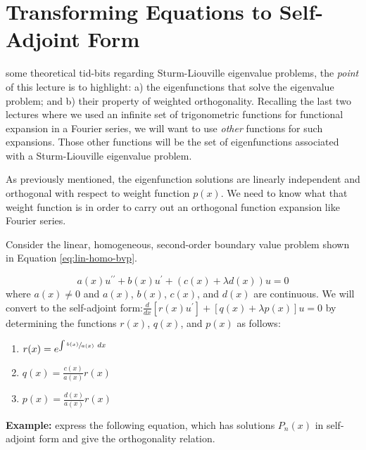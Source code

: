 \section{Transforming Equations to Self-Adjoint Form}
 some theoretical tid-bits regarding Sturm-Liouville eigenvalue problems, the \emph{point} of this lecture is to highlight: a) the eigenfunctions that solve the eigenvalue problem; and b) their property of weighted orthogonality.  Recalling the last two lectures where we used an infinite set of trigonometric functions for functional expansion in a Fourier series, we will want to use \emph{other} functions for such expansions. Those other functions will be the set of eigenfunctions associated with a Sturm-Liouville eigenvalue problem.   

As previously mentioned, the eigenfunction solutions are linearly independent and orthogonal with respect to weight function $p(x)$.  We need to know what that weight function is in order to carry out an orthogonal function expansion like Fourier series.  

Consider the linear, homogeneous, second-order boundary value problem shown in Equation \ref{eq:lin-homo-bvp}.

\begin{equation}
a(x)u^{\prime \prime} + b(x)u^{\prime} + (c(x) + \lambda d(x))u = 0
\label{eq:lin-homo-bvp}
\end{equation}
where $a(x) \ne 0$ and $a(x)$, $b(x)$, $c(x)$, and $d(x)$ are continuous.  We will convert to the self-adjoint form:$\frac{d}{dx}\left[r(x)u^{\prime}\right]+[q(x)+\lambda p(x)]u =0$ by determining the functions $r(x)$, $q(x)$, and $p(x)$ as follows:
\begin{enumerate}
\item $r(x) = e^{\int \sfrac{b(x)}{a(x)} \ dx}$
\item $q(x) = \frac{c(x)}{a(x)}r(x)$
\item $p(x) = \frac{d(x)}{a(x)}r(x)$
\end{enumerate}

\vspace{0.5cm}

\noindent\textbf{Example:} express the following equation, which has solutions $P_n(x)$ in self-adjoint form and give the orthogonality relation.

